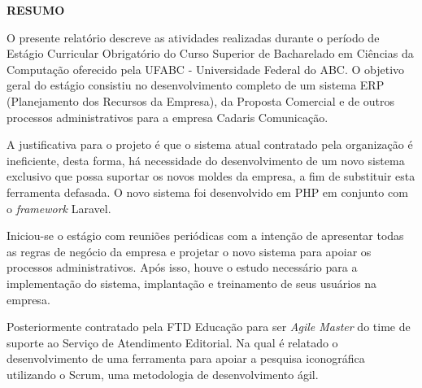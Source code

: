 \documentclass[
  12pt,            %
  openany,
  oneside,
  a4paper,         %
  english,      %
  brazil
]{article}
\numberwithin{figure}{section}
\numberwithin{table}{section}
\begin{document}

\begin{titlepage}

\begin{center}
  \textbf{RESUMO}
\end{center}

O presente relatório descreve as atividades realizadas durante o período de Estágio Curricular Obrigatório do Curso Superior de Bacharelado em Ciências da Computação oferecido pela UFABC - Universidade Federal do ABC. O objetivo geral do estágio consistiu no desenvolvimento completo de um sistema ERP (Planejamento dos Recursos da Empresa), da Proposta Comercial e de outros processos administrativos para a empresa Cadaris Comunicação.

A justificativa para o projeto é que o sistema atual contratado pela organização é ineficiente, desta forma, há necessidade do desenvolvimento de um novo sistema exclusivo que possa suportar os novos moldes da empresa, a fim de substituir esta ferramenta defasada. O novo sistema foi desenvolvido em PHP em conjunto com o \textit{framework} Laravel.

Iniciou-se o estágio com reuniões periódicas com a intenção de apresentar todas as regras de negócio da empresa e projetar o novo sistema para apoiar os processos administrativos. Após isso, houve o estudo necessário para a implementação do sistema, implantação e treinamento de seus usuários na empresa.

Posteriormente contratado pela FTD Educação para ser \textit{Agile Master} do time de suporte ao Serviço de Atendimento Editorial. Na qual é relatado o desenvolvimento de uma ferramenta para apoiar a pesquisa iconográfica utilizando o Scrum, uma metodologia de desenvolvimento ágil.

\end{titlepage}

\end{document}
